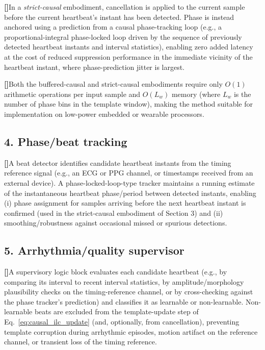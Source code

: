\documentclass[12pt]{article}
\newcounter{para}
\newcommand{\parnum}{\stepcounter{para}\noindent\textbf{[\thepara]}\quad}
\begin{document}
\parnum In a \emph{strict-causal} embodiment, cancellation is applied to the current sample before the current heartbeat's instant has been detected. Phase is instead anchored using a prediction from a causal phase-tracking loop (e.g., a proportional-integral phase-locked loop driven by the sequence of previously detected heartbeat instants and interval statistics), enabling zero added latency at the cost of reduced suppression performance in the immediate vicinity of the heartbeat instant, where phase-prediction jitter is largest.

\parnum Both the buffered-causal and strict-causal embodiments require only $O(1)$ arithmetic operations per input sample and $O(L_w)$ memory (where $L_w$ is the number of phase bins in the template window), making the method suitable for implementation on low-power embedded or wearable processors.

\subsection*{4. Phase/beat tracking}

\parnum A beat detector identifies candidate heartbeat instants from the timing reference signal (e.g., an ECG or PPG channel, or timestamps received from an external device). A phase-locked-loop-type tracker maintains a running estimate of the instantaneous heartbeat phase/period between detected instants, enabling (i) phase assignment for samples arriving before the next heartbeat instant is confirmed (used in the strict-causal embodiment of Section 3) and (ii) smoothing/robustness against occasional missed or spurious detections.

\subsection*{5. Arrhythmia/quality supervisor}

\parnum A supervisory logic block evaluates each candidate heartbeat (e.g., by comparing its interval to recent interval statistics, by amplitude/morphology plausibility checks on the timing-reference channel, or by cross-checking against the phase tracker's prediction) and classifies it as learnable or non-learnable. Non-learnable beats are excluded from the template-update step of Eq.~\eqref{eq:causal_ilc_update} (and, optionally, from cancellation), preventing template corruption during arrhythmic episodes, motion artifact on the reference channel, or transient loss of the timing reference.
\end{document}
